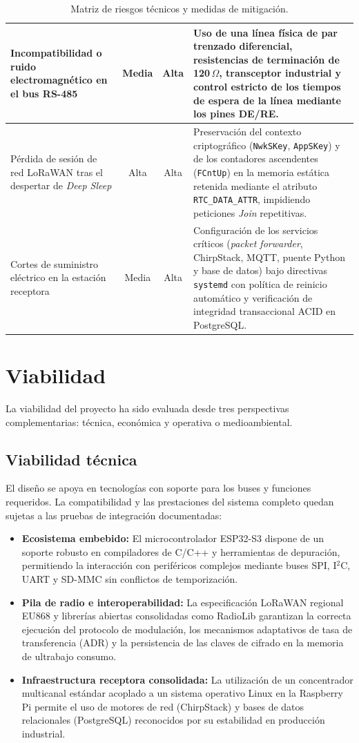 \begin{table}[htbp]
\begin{tabular}{p{3.5cm} c c p{6.8cm}}
Incompatibilidad o ruido electromagnético en el bus RS-485 & Media & Alta & Uso de una línea física de par trenzado diferencial, resistencias de terminación de 120\,$\Omega$, transceptor industrial y control estricto de los tiempos de espera de la línea mediante los pines DE/RE. \\ \hline
Pérdida de sesión de red LoRaWAN tras el despertar de \textit{Deep Sleep} & Alta & Alta & Preservación del contexto criptográfico (\texttt{NwkSKey}, \texttt{AppSKey}) y de los contadores ascendentes (\texttt{FCntUp}) en la memoria estática retenida mediante el atributo \texttt{RTC\_DATA\_ATTR}, impidiendo peticiones \textit{Join} repetitivas. \\ \hline
Cortes de suministro eléctrico en la estación receptora & Media & Alta & Configuración de los servicios críticos (\textit{packet forwarder}, ChirpStack, MQTT, puente Python y base de datos) bajo directivas \texttt{systemd} con política de reinicio automático y verificación de integridad transaccional ACID en PostgreSQL. \\ \hline
\end{tabular}
\caption{Matriz de riesgos técnicos y medidas de mitigación.}
\label{tab:matriz_riesgos}
\end{table}


\section{Viabilidad}

La viabilidad del proyecto ha sido evaluada desde tres perspectivas complementarias: técnica, económica y operativa o medioambiental.

\subsection{Viabilidad técnica}
El diseño se apoya en tecnologías con soporte para los buses y funciones requeridos. La compatibilidad y las prestaciones del sistema completo quedan sujetas a las pruebas de integración documentadas:
\begin{itemize}
    \item \textbf{Ecosistema embebido:} El microcontrolador ESP32-S3 dispone de un soporte robusto en compiladores de C/C++ y herramientas de depuración, permitiendo la interacción con periféricos complejos mediante buses SPI, I$^2$C, UART y SD-MMC sin conflictos de temporización.
    \item \textbf{Pila de radio e interoperabilidad:} La especificación LoRaWAN regional EU868 y librerías abiertas consolidadas como RadioLib garantizan la correcta ejecución del protocolo de modulación, los mecanismos adaptativos de tasa de transferencia (ADR) y la persistencia de las claves de cifrado en la memoria de ultrabajo consumo.
    \item \textbf{Infraestructura receptora consolidada:} La utilización de un concentrador multicanal estándar acoplado a un sistema operativo Linux en la Raspberry Pi permite el uso de motores de red (ChirpStack) y bases de datos relacionales (PostgreSQL) reconocidos por su estabilidad en producción industrial.
\end{itemize}

